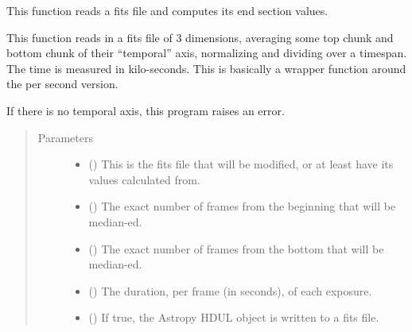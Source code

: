 \documentclass[letterpaper,10pt,english]{sphinxmanual}
\begin{document}
\begin{fulllineitems}
\label{\detokenize{python_docstrings/IfA_Smeargle.bravo.averaging:IfA_Smeargle.bravo.averaging.average_endpoints_per_kilosecond}}
This function reads a fits file and computes its end section values.

This function reads in a fits file of 3 dimensions, averaging some
top chunk and bottom chunk of their “temporal” axis, normalizing
and dividing over a timespan. The time is measured in kilo-seconds. This
is basically a wrapper function around the per second version.

If there is no temporal axis, this program raises an error.
\begin{quote}\begin{description}
\item[{Parameters}] \leavevmode\begin{itemize}
\item {} 
 () \textendash{} This is the fits file that will be modified, or at least have its
values calculated from.

\item {} 
 () \textendash{} The exact number of frames from the beginning that will be median-ed.

\item {} 
 () \textendash{} The exact number of frames from the bottom that will be median-ed.

\item {} 
 () \textendash{} The duration, per frame (in seconds), of each exposure.

\item {} 
 (\sphinxstyleliteralemphasis{\sphinxupquote{ (}}\sphinxstyleliteralemphasis{\sphinxupquote{)}}) \textendash{} If true, the Astropy HDUL object is written to a fits file.


\end{itemize}
\end{description}
\end{quote}
\end{fulllineitems}
\end{document}
